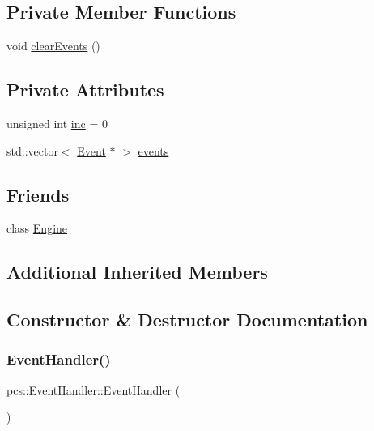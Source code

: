 \subsection*{Private Member Functions}
\begin{DoxyCompactItemize}
\item 
void \hyperlink{classpcs_1_1EventHandler_a91240cdab030a6d37b9c9799305a9e8a}{clear\+Events} ()
\end{DoxyCompactItemize}
\subsection*{Private Attributes}
\begin{DoxyCompactItemize}
\item 
unsigned int \hyperlink{classpcs_1_1EventHandler_a31eccb3a5277a000785059cb34b31fd1}{inc} = 0
\item 
std\+::vector$<$ \hyperlink{classpcs_1_1Event}{Event} $\ast$ $>$ \hyperlink{classpcs_1_1EventHandler_a05bd1c27d4ee1082c31fcaf767a43939}{events}
\end{DoxyCompactItemize}
\subsection*{Friends}
\begin{DoxyCompactItemize}
\item 
class \hyperlink{classpcs_1_1EventHandler_a3e1914489e4bed4f9f23cdeab34a43dc}{Engine}
\end{DoxyCompactItemize}
\subsection*{Additional Inherited Members}


\subsection{Constructor \& Destructor Documentation}
\mbox{\label{classpcs_1_1EventHandler_af980c02cecb98a61be2d23dcdbb525c4}} 
\subsubsection{\texorpdfstring{Event\+Handler()}{EventHandler()}}
{\footnotesize\ttfamily pcs\+::\+Event\+Handler\+::\+Event\+Handler (\begin{DoxyParamCaption}{ }\end{DoxyParamCaption})}



